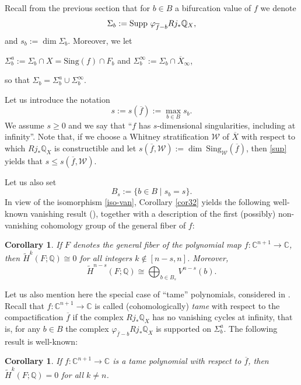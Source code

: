 \documentclass[12pt,leqno,twoside]{amsart}
\newtheorem{corollary}[theorem]{Corollary}
\theoremstyle{remark}
\theoremstyle{remark}
\theoremstyle{definition}
\theoremstyle{remark}
\theoremstyle{remark}
\theoremstyle{remark}
\numberwithin{equation}{section}  %
\def\be{\begin{equation}}
\def\ee{\end{equation}}
\def\bc{\begin{corollary}}
\def\ec{\end{corollary}}
\newcommand{\cW}{\mathcal{W}}
\newcommand{\bC}{\mathbb{C}}
\newcommand{\bQ}{\mathbb{Q}}
\newcommand{\of}{\overline{f}}
\newcommand{\oX}{\overline{X}}
\newcommand{\Sing}{\mathrm{Sing}}
\begin{document}
Recall  from the previous section that for $b \in B$ a bifurcation value of $f$ we denote
\[\Sigma_b:={\rm Supp} \ \varphi_{\overline{f}-b}Rj_*\bQ_X,\] and $s_b:=\dim \Sigma_b$.
Moreover, we let 
\begin{center} $\Sigma^a_b:=\Sigma_b \cap X=\Sing(f) \cap F_b$ and $\Sigma_b^\infty:=\Sigma_b \cap \oX_\infty$,\end{center} so that $\Sigma_b=\Sigma^a_b \cup \Sigma_b^\infty$.

Let us introduce the notation \be\label{sdef} s:=s(\of):=\max_{b\in B} s_b.\ee We assume $s \geq 0$ and we say that ``$f$ has $s$-dimensional singularities, including at infinity''.  
Note that, if we choose a Whitney stratification $\cW$ of $\oX$ with respect to which $Rj_*\bQ_X$ is constructible and let $s(\of,\cW):=\dim \ \Sing_{\cW}(\of)$, then \eqref{sup} yields that $s \leq s(\of,\cW)$.

Let us also set
\[B_s:=\{b \in B \mid s_b=s\}.\]
In view of the isomorphism \eqref{iso-van}, Corollary \ref{cor32} yields the following well-known vanishing result (\cite{NN,ST,Bre,Di}), together with a description of the first (possibly) non-vanishing cohomology group of the general fiber of $f$:
\bc\label{c26}
If $F$ denotes the general fiber of the polynomial map $f\colon \bC^{n+1}\to \bC$, then
$\widetilde{H}^k(F;\bQ)\cong 0$ for all integers $k \notin [n-s,n]$. Moreover,
\be\label{nmsgen}
\widetilde{H}^{n-s}(F;\bQ)\cong \bigoplus_{b \in B_s} V^{n-s}(b).
\ee
\ec

Let us also mention here the special case of ``tame'' polynomials, considered in \cite{Sab,Pa2,Di}. Recall that $f\colon \bC^{n+1}\to \bC$ is called (cohomologically) {\it tame} with respect to the compactification $\of$ if the complex $Rj_*\bQ_X$ has no vanishing cycles at infinity, that is, for any $b \in B$ the complex $\varphi_{\overline{f}-b}Rj_*\bQ_X$ is supported on $\Sigma^a_b$. The following result is well-known:
\bc\label{coro32}
If $f\colon \bC^{n+1}\to \bC$ is a tame polynomial with respect to $\of$, then $\widetilde{H}^k(F;\bQ)=0$ for all $k \neq n$.
\ec
\end{document}
